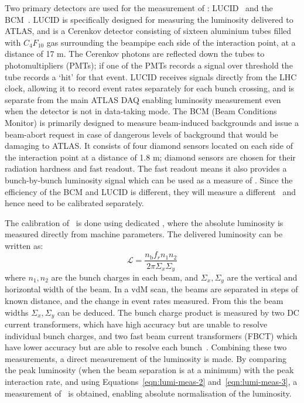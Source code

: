 Two primary detectors are used for the measurement of \muVis:
LUCID~\cite{Villa:1222513} and the BCM~\cite{1748-0221-3-02-P02004}.
LUCID is specifically designed for measuring the luminosity delivered to ATLAS, and is a
Cerenkov detector consisting of sixteen aluminium tubes filled with
$C_{4}F_{10}$ gas surrounding the beampipe each side of the interaction point,
at a distance of 17 m. The Cerenkov photons are reflected down the tubes to
photomultipliers (PMTs); if one of the PMTs records a signal over
threshold the tube records a `hit' for that event. LUCID receives signals
directly from the LHC clock, allowing it to record event rates separately for
each bunch crossing, and is separate from the main ATLAS DAQ enabling luminosity
measurement even when the detector is not in data-taking mode. The BCM (Beam
Conditions Monitor) is primarily designed to measure beam-induced backgrounds and
issue a beam-abort request in case of dangerous levels of background that would
be damaging to ATLAS. It consists of four diamond sensors located on each side
of the interaction point at a distance of 1.8 m; diamond sensors are chosen for
their radiation hardness and fast readout. The fast readout means it also
provides a bunch-by-bunch luminosity signal which can be used as a measure of
\muVis. Since the efficiency of the BCM and LUCID is different, they will
measure a different \muVis\ and hence need to be calibrated separately.

The calibration of \sigmaVis\ is done using dedicated , where the absolute luminosity is measured directly from machine
parameters. The delivered luminosity can be written as:
\begin{equation}
\mathcal{L} = \frac{ n_{\mathrm{b}} f_{r} n_{1} n_{2}}{ 2 \pi \Sigma_{x} \Sigma_{y} }
\label{eqn:lumi-meas-3}
\end{equation}
where $n_{1},n_{2}$ are the bunch charges in each beam, and
$\Sigma_{x},\Sigma_{y}$ are the vertical and horizontal width of the beam. In
a vdM scan, the beams are separated in steps of known distance, and the change
in event rates measured. From this the beam widths 
$\Sigma_{x},\Sigma_{y}$ can be deduced. The bunch charge product is measured by two DC
current transformers, which have high accuracy but are unable to resolve
individual bunch charges, and two fast beam current transformers (FBCT) which
have lower accuracy but are able to resolve each
bunch~\cite{lhc-beam-currents}. 
Combining these two measurements, a direct measurement of the luminosity is made. By
comparing the peak luminosity (when the beam separation is at a minimum) with
the peak interaction rate, and using Equations~\ref{eqn:lumi-meas-2}
and~\ref{eqn:lumi-meas-3}, a measurement of \sigmaVis\ is obtained, enabling
absolute normalisation of the luminosity.

